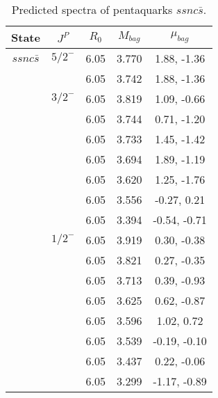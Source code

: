 \documentclass[prd,twocolumn,floatfix,nofootinbib]{revtex4}
\begin{document}
\renewcommand{\tabcolsep}{0.5cm}
\renewcommand{\arraystretch}{1.2}
\begin{table*}[!htbp]
    \caption{Predicted spectra of pentaquarks $ssnc\bar{s}$.}
    \begin{tabular}{ccccc}
        \hline\hline
        {\rm State} &$J^{P}$ &$R_{0}$ &$M_{bag}$ &$\mu_{bag}$ \\ \hline
        $ssnc\bar{s}$
            &${5/2}^{-}$    &6.05   &3.770  &1.88, -1.36 \\
            &               &6.05   &3.742  &1.88, -1.36 \\
            &${3/2}^{-}$    &6.05   &3.819  &1.09, -0.66 \\
            &               &6.05   &3.744  &0.71, -1.20 \\
            &               &6.05   &3.733  &1.45, -1.42 \\
            &               &6.05   &3.694  &1.89, -1.19 \\
            &               &6.05   &3.620  &1.25, -1.76 \\
            &               &6.05   &3.556  &-0.27, 0.21 \\
            &               &6.05   &3.394  &-0.54, -0.71 \\
            &${1/2}^{-}$    &6.05   &3.919  &0.30, -0.38 \\
            &               &6.05   &3.821  &0.27, -0.35 \\
            &               &6.05   &3.713  &0.39, -0.93 \\
            &               &6.05   &3.625  &0.62, -0.87 \\
            &               &6.05   &3.596  &1.02, 0.72 \\
            &               &6.05   &3.539  &-0.19, -0.10 \\
            &               &6.05   &3.437  &0.22, -0.06 \\
            &               &6.05   &3.299  &-1.17, -0.89 \\  
        \hline\hline
    \end{tabular}
\end{table*}
\end{document}
